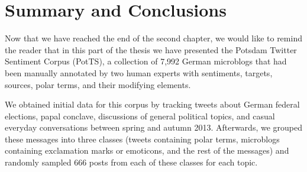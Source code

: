 

\section{Summary and Conclusions}

Now that we have reached the end of the second chapter, we would like
to remind the reader that in this part of the thesis we have presented
the Potsdam Twitter Sentiment Corpus (PotTS), a collection of 7,992
German microblogs that had been manually annotated by two human
experts with sentiments, targets, sources, polar terms, and their
modifying elements.

We obtained initial data for this corpus by tracking tweets about
German federal elections, papal conclave, discussions of general
political topics, and casual everyday conversations between spring and
autumn 2013.  Afterwards, we grouped these messages into three classes
(tweets containing polar terms, microblogs containing exclamation
marks or emoticons, and the rest of the messages) and randomly sampled
666 posts from each of these classes for each topic.


